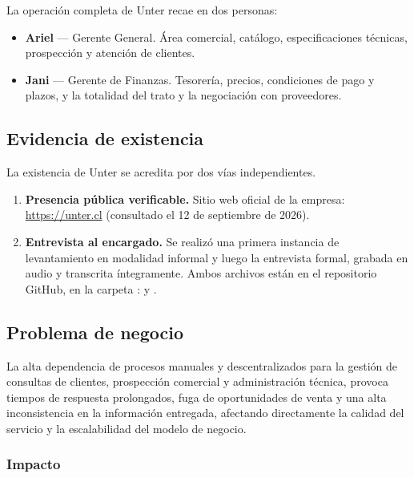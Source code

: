 \documentclass{article}
\begin{document}
\noindent La operación completa de Unter recae en dos personas:

\begin{itemize}
\item \textbf{Ariel} --- Gerente General. Área comercial, catálogo, especificaciones técnicas, prospección y atención de clientes.
\item \textbf{Jani} --- Gerente de Finanzas. Tesorería, precios, condiciones de pago y plazos, y la totalidad del trato y la negociación con proveedores.
\end{itemize}

\subsection{Evidencia de existencia}

La existencia de Unter se acredita por dos vías independientes.

\begin{enumerate}
\item \textbf{Presencia pública verificable.} Sitio web oficial de la empresa: \url{https://unter.cl} (consultado el 12 de septiembre de 2026).
\item \textbf{Entrevista al encargado.} Se realizó una primera instancia de levantamiento en modalidad informal y luego la entrevista formal, grabada en audio y transcrita íntegramente. Ambos archivos están en el repositorio GitHub, en la carpeta :  y .
\end{enumerate}

\subsection{Problema de negocio}

La alta dependencia de procesos manuales y descentralizados para la gestión de consultas de clientes, prospección comercial y administración técnica, provoca tiempos de respuesta prolongados, fuga de oportunidades de venta y una alta inconsistencia en la información entregada, afectando directamente la calidad del servicio y la escalabilidad del modelo de negocio.

\subsubsection*{Impacto}
\end{document}
